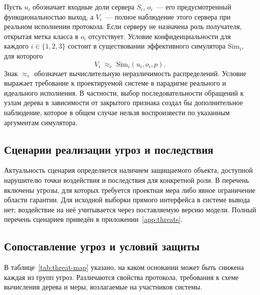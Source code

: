 Пусть $u_i$ обозначает входные доли сервера $S_i$, $o_i$~--- его
предусмотренный функциональностью выход, а $V_i$~--- полное наблюдение
этого сервера при реальном исполнении протокола. Если серверу не назначена
роль получателя, открытая метка класса в $o_i$ отсутствует.
Условие конфиденциальности для каждого $i\in\{1,2,3\}$ состоит
в существовании эффективного симулятора $\mathrm{Sim}_i$, для которого
\[
    V_i \;\approx_{\mathrm{c}}\; \mathrm{Sim}_i(u_i,o_i,p).
\]
Знак $\approx_{\mathrm{c}}$ обозначает вычислительную неразличимость
распределений. Условие выражает требование к проектируемой системе
в парадигме реального и идеального исполнения. В частности, выбор
последовательности обращений к узлам дерева в зависимости от закрытого
признака создал бы дополнительное наблюдение, которое в общем случае
нельзя воспроизвести по указанным аргументам симулятора.

\subsection{Сценарии реализации угроз и последствия}

Актуальность сценария определяется наличием защищаемого объекта, доступной нарушителю точки воздействия и последствия для конкретной роли. В перечень включены угрозы, для которых требуется проектная мера либо явное ограничение области гарантии. Для исходной выборки прямого интерфейса в системе вывода нет; воздействие на неё учитывается через поставляемую версию модели. Полный перечень сценариев приведён в приложении~\ref{app:threats}.

\subsection{Сопоставление угроз и условий защиты}

В таблице~\ref{tab:threat-map} указано, на каком основании может быть
снижена каждая из групп угроз. Различаются свойства протокола,
требования к схеме вычисления дерева и меры, возлагаемые на участников
системы.

